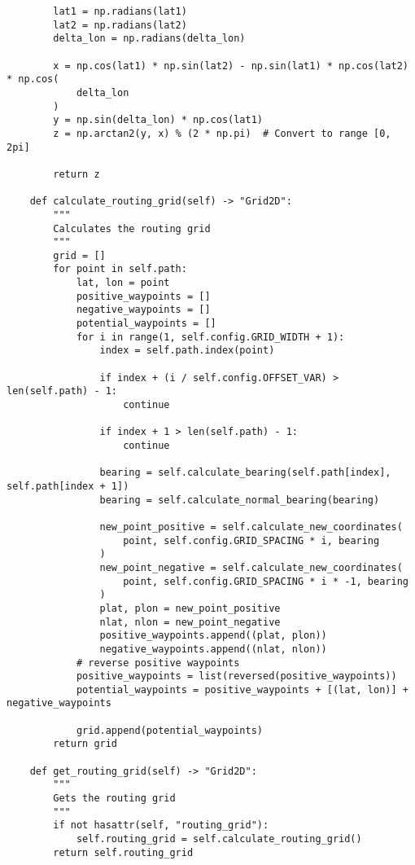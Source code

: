 \begin{verbatim}
        lat1 = np.radians(lat1)
        lat2 = np.radians(lat2)
        delta_lon = np.radians(delta_lon)

        x = np.cos(lat1) * np.sin(lat2) - np.sin(lat1) * np.cos(lat2) * np.cos(
            delta_lon
        )
        y = np.sin(delta_lon) * np.cos(lat1)
        z = np.arctan2(y, x) % (2 * np.pi)  # Convert to range [0, 2pi]

        return z

    def calculate_routing_grid(self) -> "Grid2D":
        """
        Calculates the routing grid
        """
        grid = []
        for point in self.path:
            lat, lon = point
            positive_waypoints = []
            negative_waypoints = []
            potential_waypoints = []
            for i in range(1, self.config.GRID_WIDTH + 1):
                index = self.path.index(point)

                if index + (i / self.config.OFFSET_VAR) > len(self.path) - 1:
                    continue

                if index + 1 > len(self.path) - 1:
                    continue

                bearing = self.calculate_bearing(self.path[index], self.path[index + 1])
                bearing = self.calculate_normal_bearing(bearing)

                new_point_positive = self.calculate_new_coordinates(
                    point, self.config.GRID_SPACING * i, bearing
                )
                new_point_negative = self.calculate_new_coordinates(
                    point, self.config.GRID_SPACING * i * -1, bearing
                )
                plat, plon = new_point_positive
                nlat, nlon = new_point_negative
                positive_waypoints.append((plat, plon))
                negative_waypoints.append((nlat, nlon))
            # reverse positive waypoints
            positive_waypoints = list(reversed(positive_waypoints))
            potential_waypoints = positive_waypoints + [(lat, lon)] + negative_waypoints

            grid.append(potential_waypoints)
        return grid

    def get_routing_grid(self) -> "Grid2D":
        """
        Gets the routing grid
        """
        if not hasattr(self, "routing_grid"):
            self.routing_grid = self.calculate_routing_grid()
        return self.routing_grid

\end{verbatim}
